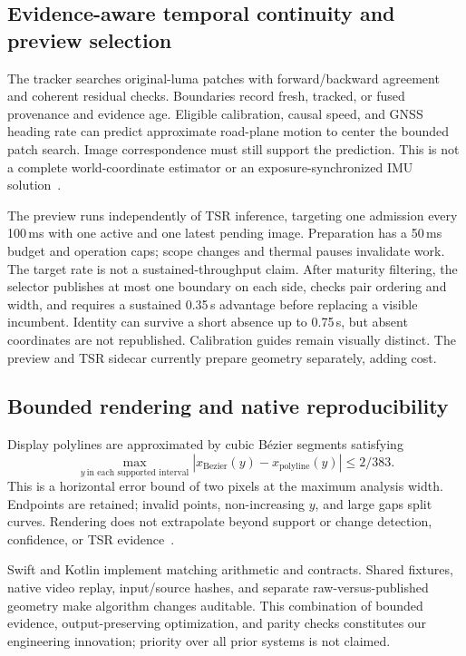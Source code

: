 \documentclass[11pt,a4paper]{article}
\begin{document}
\subsection{Evidence-aware temporal continuity and preview selection}
The tracker searches original-luma patches with forward/backward agreement and
coherent residual checks. Boundaries record fresh, tracked, or fused provenance
and evidence age. Eligible calibration, causal speed, and GNSS heading rate can
predict approximate road-plane motion to center the bounded patch search.
Image correspondence must still support the prediction. This is not a complete
world-coordinate estimator or an exposure-synchronized IMU solution~\cite{stability}.

The preview runs independently of TSR inference, targeting one admission every
100\,ms with one active and one latest pending image. Preparation has a 50\,ms
budget and operation caps; scope changes and thermal pauses invalidate work.
The target rate is not a sustained-throughput claim. After maturity filtering,
the selector publishes at most one boundary on each side, checks pair ordering
and width, and requires a sustained 0.35\,s advantage before replacing a visible
incumbent. Identity can survive a short absence up to 0.75\,s, but absent
coordinates are not republished. Calibration guides remain visually distinct.
The preview and TSR sidecar currently prepare geometry separately, adding cost.

\subsection{Bounded rendering and native reproducibility}
Display polylines are approximated by cubic B\'ezier segments satisfying
\begin{equation}
 \max_{y\ \text{in each supported interval}}
   |x_{\mathrm{Bezier}}(y)-x_{\mathrm{polyline}}(y)|\leq 2/383.
\end{equation}
This is a horizontal error bound of two pixels at the maximum analysis width.
Endpoints are retained; invalid points, non-increasing $y$, and large gaps split
curves. Rendering does not extrapolate beyond support or change detection,
confidence, or TSR evidence~\cite{bezier}.

Swift and Kotlin implement matching arithmetic and contracts. Shared fixtures,
native video replay, input/source hashes, and separate raw-versus-published
geometry make algorithm changes auditable. This combination of bounded evidence,
output-preserving optimization, and parity checks constitutes our engineering
innovation; priority over all prior systems is not claimed.
\end{document}
